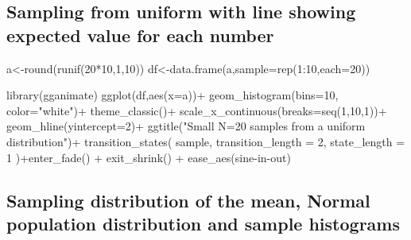 \documentclass[
  letterpaper,
  DIV=11,
  numbers=noendperiod]{scrreprt}
\newenvironment{Shaded}{\begin{snugshade}}{\end{snugshade}}
\newcommand{\AttributeTok}[1]{\textcolor[rgb]{0.40,0.45,0.13}{#1}}
\newcommand{\DecValTok}[1]{\textcolor[rgb]{0.68,0.00,0.00}{#1}}
\newcommand{\FunctionTok}[1]{\textcolor[rgb]{0.28,0.35,0.67}{#1}}
\newcommand{\NormalTok}[1]{\textcolor[rgb]{0.00,0.23,0.31}{#1}}
\newcommand{\OtherTok}[1]{\textcolor[rgb]{0.00,0.23,0.31}{#1}}
\newcommand{\SpecialCharTok}[1]{\textcolor[rgb]{0.37,0.37,0.37}{#1}}
\newcommand{\StringTok}[1]{\textcolor[rgb]{0.13,0.47,0.30}{#1}}
\begin{document}
\subsection{Sampling from uniform with line showing expected value for
each
number}\label{sampling-from-uniform-with-line-showing-expected-value-for-each-number}

\begin{Shaded}
\begin{Highlighting}[]
\NormalTok{a}\OtherTok{\textless{}{-}}\FunctionTok{round}\NormalTok{(}\FunctionTok{runif}\NormalTok{(}\DecValTok{20}\SpecialCharTok{*}\DecValTok{10}\NormalTok{,}\DecValTok{1}\NormalTok{,}\DecValTok{10}\NormalTok{))}
\NormalTok{df}\OtherTok{\textless{}{-}}\FunctionTok{data.frame}\NormalTok{(a,}\AttributeTok{sample=}\FunctionTok{rep}\NormalTok{(}\DecValTok{1}\SpecialCharTok{:}\DecValTok{10}\NormalTok{,}\AttributeTok{each=}\DecValTok{20}\NormalTok{))}


\FunctionTok{library}\NormalTok{(gganimate)}
\FunctionTok{ggplot}\NormalTok{(df,}\FunctionTok{aes}\NormalTok{(}\AttributeTok{x=}\NormalTok{a))}\SpecialCharTok{+}
  \FunctionTok{geom\_histogram}\NormalTok{(}\AttributeTok{bins=}\DecValTok{10}\NormalTok{, }\AttributeTok{color=}\StringTok{"white"}\NormalTok{)}\SpecialCharTok{+}
  \FunctionTok{theme\_classic}\NormalTok{()}\SpecialCharTok{+}
  \FunctionTok{scale\_x\_continuous}\NormalTok{(}\AttributeTok{breaks=}\FunctionTok{seq}\NormalTok{(}\DecValTok{1}\NormalTok{,}\DecValTok{10}\NormalTok{,}\DecValTok{1}\NormalTok{))}\SpecialCharTok{+}
  \FunctionTok{geom\_hline}\NormalTok{(}\AttributeTok{yintercept=}\DecValTok{2}\NormalTok{)}\SpecialCharTok{+}
  \FunctionTok{ggtitle}\NormalTok{(}\StringTok{"Small N=20 samples from a uniform distribution"}\NormalTok{)}\SpecialCharTok{+}
  \FunctionTok{transition\_states}\NormalTok{(}
\NormalTok{    sample,}
    \AttributeTok{transition\_length =} \DecValTok{2}\NormalTok{,}
    \AttributeTok{state\_length =} \DecValTok{1}
\NormalTok{  )}\SpecialCharTok{+}\FunctionTok{enter\_fade}\NormalTok{() }\SpecialCharTok{+} 
  \FunctionTok{exit\_shrink}\NormalTok{() }\SpecialCharTok{+}
  \FunctionTok{ease\_aes}\NormalTok{(}\StringTok{\textquotesingle{}sine{-}in{-}out\textquotesingle{}}\NormalTok{)}
\end{Highlighting}
\end{Shaded}

\subsection{Sampling distribution of the mean, Normal population
distribution and sample
histograms}\label{sampling-distribution-of-the-mean-normal-population-distribution-and-sample-histograms}
\end{document}
